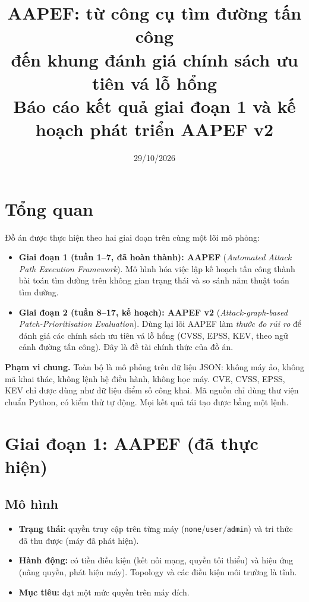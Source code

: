 \documentclass[11pt,a4paper]{article}
\title{\textbf{AAPEF: từ công cụ tìm đường tấn công\\ đến khung đánh giá chính sách ưu tiên vá lỗ hổng}\\[2pt]
\large Báo cáo kết quả giai đoạn 1 và kế hoạch phát triển AAPEF v2}
\author{}
\date{29/10/2026}
\begin{document}
\maketitle
\vspace{-1.2cm}

\section{Tổng quan}

Đồ án được thực hiện theo hai giai đoạn trên cùng một lõi mô phỏng:

\begin{itemize}
  \item \textbf{Giai đoạn 1 (tuần 1--7, đã hoàn thành): AAPEF} (\emph{Automated Attack Path Execution Framework}). Mô hình hóa việc lập kế hoạch tấn công thành bài toán tìm đường trên không gian trạng thái và so sánh năm thuật toán tìm đường.
  \item \textbf{Giai đoạn 2 (tuần 8--17, kế hoạch): AAPEF v2} (\emph{Attack-graph-based Patch-Prioritisation Evaluation}). Dùng lại lõi AAPEF làm \emph{thước đo rủi ro} để đánh giá các chính sách ưu tiên vá lỗ hổng (CVSS, EPSS, KEV, theo ngữ cảnh đường tấn công). Đây là đề tài chính thức của đồ án.
\end{itemize}

\textbf{Phạm vi chung.} Toàn bộ là mô phỏng trên dữ liệu JSON: không máy ảo, không mã khai thác, không lệnh hệ điều hành, không học máy. CVE, CVSS, EPSS, KEV chỉ được dùng như dữ liệu điểm số công khai. Mã nguồn chỉ dùng thư viện chuẩn Python, có kiểm thử tự động. Mọi kết quả tái tạo được bằng một lệnh.

\section{Giai đoạn 1: AAPEF (đã thực hiện)}

\subsection{Mô hình}

\begin{itemize}
  \item \textbf{Trạng thái:} quyền truy cập trên từng máy (\texttt{none}/\texttt{user}/\texttt{admin}) và tri thức đã thu được (máy đã phát hiện).
  \item \textbf{Hành động:} có tiền điều kiện (kết nối mạng, quyền tối thiểu) và hiệu ứng (nâng quyền, phát hiện máy). Topology và các điều kiện môi trường là tĩnh.
  \item \textbf{Mục tiêu:} đạt một mức quyền trên máy đích.
\end{itemize}
\end{document}
